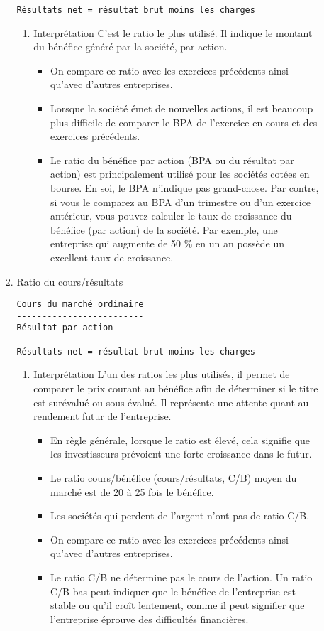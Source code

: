\documentclass[11pt]{article}
\begin{document}
\begin{enumerate}
\begin{enumerate}
\begin{enumerate}
\begin{verbatim}
Résultats net = résultat brut moins les charges
\end{verbatim}
\begin{enumerate}
\item Interprétation
\label{sec:org6dcbab2}
C'est le ratio le plus utilisé. Il indique le montant du bénéfice généré par la
société, par action.
\begin{itemize}
\item On compare ce ratio avec les exercices précédents ainsi qu’avec d’autres
entreprises.
\item Lorsque la société émet de nouvelles actions, il est beaucoup plus difficile
de comparer le BPA de l'exercice en cours et des exercices précédents.
\item Le ratio du bénéfice par action (BPA ou du résultat par action) est
principalement utilisé pour les sociétés cotées en bourse. En soi, le BPA
n'indique pas grand-chose. Par contre, si vous le comparez au BPA d'un
trimestre ou d'un exercice antérieur, vous pouvez calculer le taux de
croissance du bénéfice (par action) de la société. Par exemple, une entreprise
qui augmente de 50 \% en un an possède un excellent taux de croissance.
\end{itemize}
\end{enumerate}
\item Ratio du cours/résultats
\label{sec:org9423563}
\begin{verbatim}
Cours du marché ordinaire
-------------------------
Résultat par action

Résultats net = résultat brut moins les charges
\end{verbatim}
\begin{enumerate}
\item Interprétation
\label{sec:org832d235}
L'un des ratios les plus utilisés, il permet de comparer le prix courant au
bénéfice afin de déterminer si le titre est surévalué ou sous-évalué. Il
représente une attente quant au rendement futur de l'entreprise.
\begin{itemize}
\item En règle générale, lorsque le ratio est élevé, cela signifie que les
investisseurs prévoient une forte croissance dans le futur.
\item Le ratio cours/bénéfice (cours/résultats, C/B) moyen du marché est de 20 à 25
fois le bénéfice.
\item Les sociétés qui perdent de l'argent n'ont pas de ratio C/B.
\item On compare ce ratio avec les exercices précédents ainsi qu’avec d’autres
entreprises.
\item Le ratio C/B ne détermine pas le cours de l'action. Un ratio C/B bas peut
indiquer que le bénéfice de l'entreprise est stable ou qu'il croît lentement,
comme il peut signifier que l'entreprise éprouve des difficultés financières.
\end{itemize}
\end{enumerate}
\end{enumerate}
\end{enumerate}
\end{enumerate}
\end{document}
